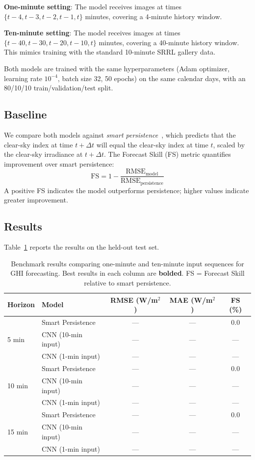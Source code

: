 \documentclass[twoside,11pt]{article}
\begin{document}
\textbf{One-minute setting}: The model receives images at times $\{t-4, t-3, t-2, t-1, t\}$ minutes, covering a 4-minute history window.

\textbf{Ten-minute setting}: The model receives images at times $\{t-40, t-30, t-20, t-10, t\}$ minutes, covering a 40-minute history window. This mimics training with the standard 10-minute SRRL gallery data.

Both models are trained with the same hyperparameters (Adam optimizer, learning rate $10^{-4}$, batch size 32, 50 epochs) on the same calendar days, with an 80/10/10 train/validation/test split.

\subsection{Baseline}

We compare both models against \textit{smart persistence}~\citep{yang2020making}, which predicts that the clear-sky index at time $t + \Delta t$ will equal the clear-sky index at time $t$, scaled by the clear-sky irradiance at $t + \Delta t$. The Forecast Skill (FS) metric quantifies improvement over smart persistence:
\[
\text{FS} = 1 - \frac{\text{RMSE}_{\text{model}}}{\text{RMSE}_{\text{persistence}}}
\]
A positive FS indicates the model outperforms persistence; higher values indicate greater improvement.

\subsection{Results}

Table~\ref{tab:benchmark} reports the results on the held-out test set.

\begin{table}[t]
\caption{Benchmark results comparing one-minute and ten-minute input sequences for GHI forecasting. Best results in each column are \textbf{bolded}. FS = Forecast Skill relative to smart persistence.}
\label{tab:benchmark}
\centering
\begin{tabular}{llccc}
\toprule
\textbf{Horizon} & \textbf{Model} & \textbf{RMSE (W/m$^2$)} & \textbf{MAE (W/m$^2$)} & \textbf{FS (\%)} \\
\midrule
\multirow{3}{*}{5 min} & Smart Persistence & --- & --- & 0.0 \\
 & CNN (10-min input) & --- & --- & --- \\
 & CNN (1-min input) & --- & --- & --- \\
\midrule
\multirow{3}{*}{10 min} & Smart Persistence & --- & --- & 0.0 \\
 & CNN (10-min input) & --- & --- & --- \\
 & CNN (1-min input) & --- & --- & --- \\
\midrule
\multirow{3}{*}{15 min} & Smart Persistence & --- & --- & 0.0 \\
 & CNN (10-min input) & --- & --- & --- \\
 & CNN (1-min input) & --- & --- & --- \\
\bottomrule
\end{tabular}
\end{table}
\end{document}
